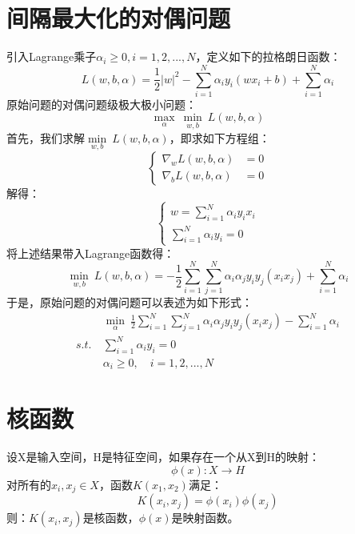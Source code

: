 \section{间隔最大化的对偶问题}
引入Lagrange乘子$\alpha_i \ge 0, i=1,2,...,N$，定义如下的拉格朗日函数：
$$ L(w,b,\alpha)= \frac{1}{2} |w|^2 - \sum_{i=1}^N \alpha_i y_i(w x_i + b) + \sum_{i=1}^N \alpha_i$$
原始问题的对偶问题级极大极小问题：
$$ \underset{\alpha}{\max}\ \underset{w,b}{\min}\ L(w,b,\alpha) $$
首先，我们求解$\underset{w,b}{\min}\ L(w,b,\alpha)$，即求如下方程组：
$$
\begin{cases}
    \nabla_w L(w,b,\alpha)&= 0 \\
    \nabla_b L(w,b,\alpha)&= 0
\end{cases}
$$
解得：
$$
\begin{cases}
    w = \sum\limits_{i=1}^N \alpha_i y_i x_i \\
    \sum\limits_{i=1}^N \alpha_i y_i = 0
\end{cases}
$$
将上述结果带入Lagrange函数得：
$$ \underset{w,b}{\min}\ L(w,b,\alpha) = -\frac{1}{2} \sum_{i=1}^N \sum_{j=1}^N \alpha_i \alpha_j y_i y_j (x_i x_j) + \sum_{i=1}^N \alpha_i $$
于是，原始问题的对偶问题可以表述为如下形式：
\begin{align*}
    & \underset{\alpha}{\min}\ \frac{1}{2} \sum_{i=1}^N \sum_{j=1}^N \alpha_i \alpha_j y_i y_j (x_i x_j) - \sum_{i=1}^N \alpha_i \\
    s.t.\ & \sum_{i=1}^N \alpha_i y_i = 0 \\
          & \alpha_i \ge 0,\quad i=1, 2, ..., N
\end{align*}

\section{核函数}
设X是输入空间，H是特征空间，如果存在一个从X到H的映射：
$$ \phi(x): X \rightarrow H $$
对所有的$x_i, x_j \in X$，函数$K(x_1,x_2)$满足：
$$ K(x_i,x_j) = \phi(x_i) \phi(x_j) $$
则：$K(x_i,x_j)$是核函数，$\phi(x)$是映射函数。

